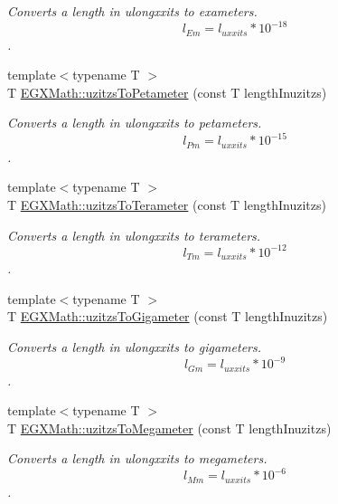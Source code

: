 \begin{DoxyCompactItemize}
\begin{DoxyCompactList}\small\item\em Converts a length in ulongxxits to exameters. \[ l_{Em}=l_{uxxits} * 10^{-18} \]. \end{DoxyCompactList}\item 
{\footnotesize template$<$typename T $>$ }\\T \mbox{\hyperlink{group___e_g_x_math-_conversions-_length_conversions-uzitzs-_s_i_gafe93d0226789fd78c2ffa4223eb6af7b}{E\+G\+X\+Math\+::uzitzs\+To\+Petameter}} (const T length\+Inuzitzs)
\begin{DoxyCompactList}\small\item\em Converts a length in ulongxxits to petameters. \[ l_{Pm}=l_{uxxits} * 10^{-15} \]. \end{DoxyCompactList}\item 
{\footnotesize template$<$typename T $>$ }\\T \mbox{\hyperlink{group___e_g_x_math-_conversions-_length_conversions-uzitzs-_s_i_gaed1a457a06ea3b69a4c63414b08b03a3}{E\+G\+X\+Math\+::uzitzs\+To\+Terameter}} (const T length\+Inuzitzs)
\begin{DoxyCompactList}\small\item\em Converts a length in ulongxxits to terameters. \[ l_{Tm}=l_{uxxits} * 10^{-12} \]. \end{DoxyCompactList}\item 
{\footnotesize template$<$typename T $>$ }\\T \mbox{\hyperlink{group___e_g_x_math-_conversions-_length_conversions-uzitzs-_s_i_ga15833fbe62cb7d741b808bc63a21df55}{E\+G\+X\+Math\+::uzitzs\+To\+Gigameter}} (const T length\+Inuzitzs)
\begin{DoxyCompactList}\small\item\em Converts a length in ulongxxits to gigameters. \[ l_{Gm}=l_{uxxits} * 10^{-9} \]. \end{DoxyCompactList}\item 
{\footnotesize template$<$typename T $>$ }\\T \mbox{\hyperlink{group___e_g_x_math-_conversions-_length_conversions-uzitzs-_s_i_ga237ffeef9137de3dd2cf5ae0eacf973e}{E\+G\+X\+Math\+::uzitzs\+To\+Megameter}} (const T length\+Inuzitzs)
\begin{DoxyCompactList}\small\item\em Converts a length in ulongxxits to megameters. \[ l_{Mm}=l_{uxxits} * 10^{-6} \]. \end{DoxyCompactList}\item 

\end{DoxyCompactItemize}

